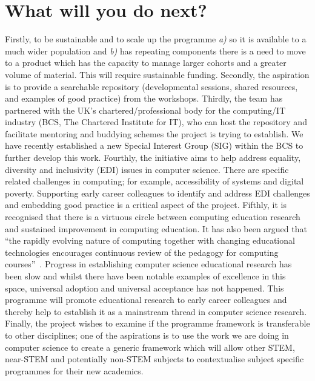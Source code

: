 \documentclass[sigconf]{acmart}
\begin{document}
\section{What will you do next?}
\begin{comment}

Scaling up
Funding 
Shared CPD learning materials
Address EDI issues in computer science
Reverse mentoring
Align with BCS
Special interest group
Web space for repository and functionality (mentoring, buddying) to store CPD sessions, shared resources for new CS academics, examples of good practice and a discussion space.
Explore what BCS are doing with professionals in non academic roles
Encourage research on pedagogy and educational issues in CS
Examine if programme framework is transferrable to other disciplines
\end{comment}
Firstly, to be sustainable and to scale up the programme {\emph{a)}}
so it is available to a much wider population and {\emph{b)}} has
repeating components there is a need to move to a product which has
the capacity to manage larger cohorts and a greater volume of
material. This will require sustainable funding. Secondly, the
aspiration is to provide a searchable repository (developmental
sessions, shared resources, and examples of good practice) from the
workshops. Thirdly, the team has partnered with the UK's
chartered/professional body for the computing/IT industry (BCS, The
Chartered Institute for IT), who can host the repository and
facilitate mentoring and buddying schemes the project is trying to
establish. We have recently established a new Special Interest Group
(SIG) within the BCS to further develop this work. Fourthly, the
initiative aims to help address equality, diversity and inclusivity
(EDI) issues in computer science. There are specific related
challenges in computing; for example, accessibility of systems and digital
poverty. Supporting early career colleagues to identify and address
EDI challenges and embedding good practice is a critical aspect of the
project. Fifthly, it is recognised that there is a virtuous circle
between computing education research and sustained improvement in
computing education. It has also been argued that ``the rapidly
evolving nature of computing together with changing educational
technologies encourages continuous review of the pedagogy for
computing courses''~\cite{Iroms2004}. Progress in establishing
computer science educational research has been slow and whilst there
have been notable examples of excellence in this space, universal
adoption and universal acceptance has not happened. This programme
will promote educational research to early career colleagues and
thereby help to establish it as a mainstream thread in computer
science research. Finally, the project wishes to examine if the
programme framework is transferable to other disciplines; one of the
aspirations is to use the work we are doing in computer science to
create a generic framework which will allow other STEM, near-STEM and
potentially non-STEM subjects to contextualise subject specific
programmes for their new academics.
\end{document}

